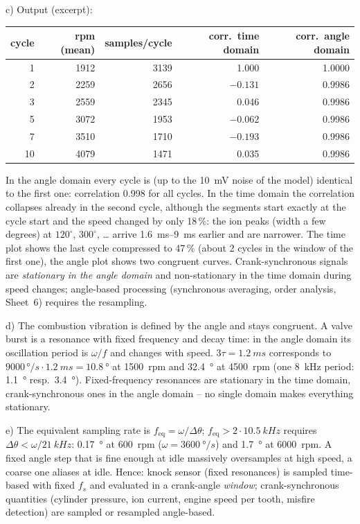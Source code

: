 \begin{solution}
c) Output (excerpt):
\begin{center}\small
\begin{tabular}{@{}rrrrr@{}}\toprule
cycle & rpm (mean) & samples/cycle & corr.\ time domain & corr.\ angle domain\\\midrule
1 & 1912 & 3139 & 1.000 & 1.0000\\
2 & 2259 & 2656 & $-0.131$ & 0.9986\\
3 & 2559 & 2345 & 0.046 & 0.9986\\
5 & 3072 & 1953 & $-0.062$ & 0.9986\\
7 & 3510 & 1710 & $-0.193$ & 0.9986\\
10 & 4079 & 1471 & 0.035 & 0.9986\\\bottomrule
\end{tabular}
\end{center}
In the angle domain every cycle is (up to the \SI{10}{mV} noise of the model)
identical to the first one: correlation 0.998 for all cycles. In the time
domain the correlation collapses already in the second cycle, although the
segments start exactly at the cycle start and the speed changed by only
18\,\%: the ion peaks (width a few degrees) at $120^\circ$, $300^\circ$, \dots{}
arrive \SIrange{1.6}{9}{ms} earlier and are narrower. The time plot shows the
last cycle compressed to 47\,\% (about 2 cycles in the window of the first
one), the angle plot shows two congruent curves. Crank-synchronous signals
are \emph{stationary in the angle domain} and non-stationary in the time
domain during speed changes; angle-based processing (synchronous averaging,
order analysis, Sheet~6) requires the resampling.

d) The combustion vibration is defined by the angle and stays congruent. A
valve burst is a resonance with fixed frequency and decay time: in the angle
domain its oscillation period is $\omega/f$ and changes with speed. $3\tau=\SI{1.2}{ms}$
corresponds to $9000\,\si{\degree/s}\cdot\SI{1.2}{ms}=\SI{10.8}{\degree}$ at
\SI{1500}{rpm} and \SI{32.4}{\degree} at \SI{4500}{rpm} (one \SI{8}{kHz} period:
\SI{1.1}{\degree} resp.\ \SI{3.4}{\degree}). Fixed-frequency resonances are
stationary in the time domain, crank-synchronous ones in the angle domain --
no single domain makes everything stationary.

e) The equivalent sampling rate is $f_\mathrm{eq}=\omega/\Delta\theta$;
$f_\mathrm{eq}>2\cdot\SI{10.5}{kHz}$ requires $\Delta\theta<\omega/\SI{21}{kHz}$:
\SI{0.17}{\degree} at \SI{600}{rpm} ($\omega=\SI{3600}{\degree/s}$) and
\SI{1.7}{\degree} at \SI{6000}{rpm}. A fixed angle step that is fine enough
at idle massively oversamples at high speed, a coarse one aliases at idle.
Hence: knock sensor (fixed resonances) is sampled time-based with fixed
$f_s$ and evaluated in a crank-angle \emph{window}; crank-synchronous
quantities (cylinder pressure, ion current, engine speed per tooth, misfire
detection) are sampled or resampled angle-based.
\end{solution}

